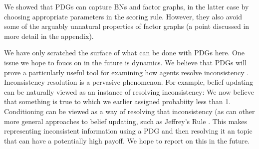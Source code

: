\documentclass{article}
\theoremstyle{plain}
\theoremstyle{definition}
\theoremstyle{remark}
\numberwithin{equation}{section}
\begin{document}
We showed that PDGs
can capture BNs and factor graphs, in the latter case by choosing 
appropriate parameters in the scoring rule. However, they also avoid
some of the arguably unnatural properties of factor graphs (a point
discussed in more detail in the appendix).

We have only scratched the surface of what can be done with PDGs here.
%
One issue we hope to foucs on in the future is dynamics.  We believe
that PDGs will prove a particularly useful tool for examining how agents resolve
inconsistency%
.
Inconsistency resolution is a pervasive phenomenon.
For example, belief updating can be naturally viewed as an instance of
resolving inconsistency: We now believe that something is true to
which we earlier assigned probabiity less than 1.  Conditioning can be
viewed as a way of resolving that inconsistency (as can other more
general approaches to belief updating, such as Jeffrey's Rule
\cite{Jeffrey68}. 
%
This makes representing inconsistent information using a PDG and then
resolving it an topic that can have a potentially high payoff.
We hope to report on this in the future.
\end{document}
